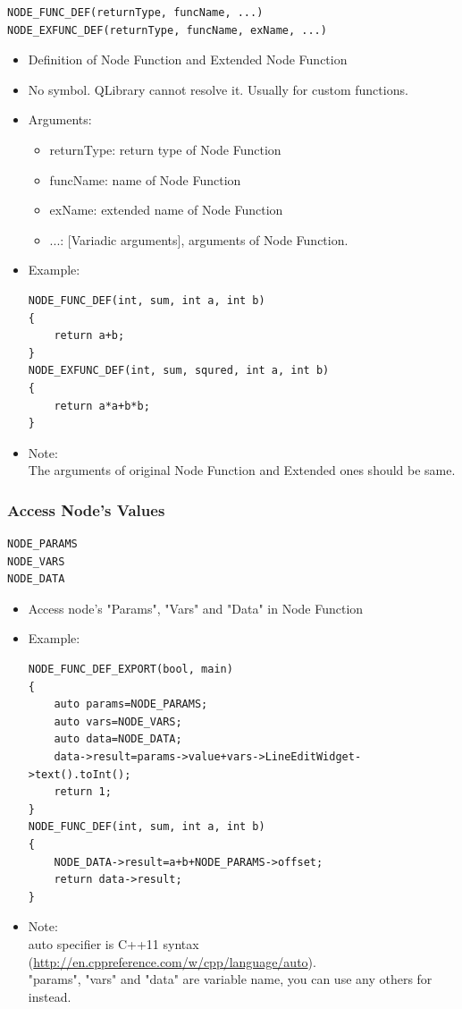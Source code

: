 \documentclass[a4paper,10pt]{book}
\begin{document}
\begin{mdframed}
\begin{verbatim}
NODE_FUNC_DEF(returnType, funcName, ...)
NODE_EXFUNC_DEF(returnType, funcName, exName, ...)
\end{verbatim}
\begin{itemize}
 \item Definition of Node Function and Extended Node Function
 \item No symbol. QLibrary cannot resolve it. Usually for custom functions.
 \item Arguments:
 \begin{itemize}
  \item returnType: return type of Node Function
  \item funcName: name of Node Function
  \item exName: extended name of Node Function
  \item ...: [Variadic arguments], arguments of Node Function.
 \end{itemize}
 \item Example:
 \begin{verbatim}
NODE_FUNC_DEF(int, sum, int a, int b)
{
    return a+b;
}
NODE_EXFUNC_DEF(int, sum, squred, int a, int b)
{
    return a*a+b*b;
}
 \end{verbatim}
 \item Note: \\ The arguments of original Node Function and Extended ones should be same.
\end{itemize}
\end{mdframed}

\subsubsection{Access Node's Values}

\begin{mdframed}
\begin{verbatim}
NODE_PARAMS
NODE_VARS
NODE_DATA
\end{verbatim}
\begin{itemize}
 \item Access node's "Params", "Vars" and "Data" in Node Function
 \item Example:
\begin{verbatim}
NODE_FUNC_DEF_EXPORT(bool, main)
{
    auto params=NODE_PARAMS;
    auto vars=NODE_VARS;
    auto data=NODE_DATA;
    data->result=params->value+vars->LineEditWidget->text().toInt();
    return 1;
}
NODE_FUNC_DEF(int, sum, int a, int b)
{
    NODE_DATA->result=a+b+NODE_PARAMS->offset;
    return data->result;
}
\end{verbatim}
\item Note:\\ auto specifier is C++11 syntax (\url{http://en.cppreference.com/w/cpp/language/auto}). \\ "params", "vars" and "data" are variable name, you can use any others for instead.
\end{itemize}
\end{mdframed}
\end{document}
